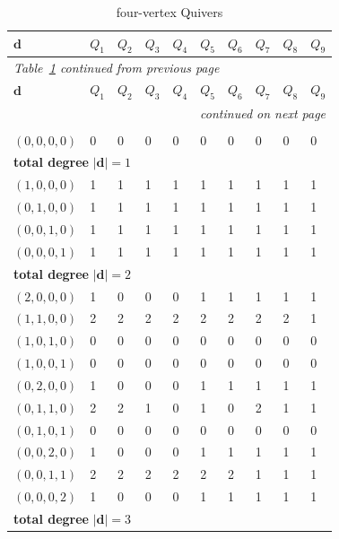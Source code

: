 \documentclass{article}
\newcommand{\bd}{\mathbf{d}}
\begin{document}
\small
\setlength{\tabcolsep}{3pt}
\begin{longtable}{|l|l|l|l|l|l|l|l|l|l|}
\caption{four-vertex Quivers}\label{tab:4vtx}\\
\hline
$\bd$ & $Q_{1}$ & $Q_{2}$ & $Q_{3}$ & $Q_{4}$ & $Q_{5}$ & $Q_{6}$ & $Q_{7}$ & $Q_{8}$ & $Q_{9}$ \\ \hline\hline
\endfirsthead
\multicolumn{10}{l}{\small\itshape Table~\ref{tab:4vtx} continued from previous page} \\ \hline
$\bd$ & $Q_{1}$ & $Q_{2}$ & $Q_{3}$ & $Q_{4}$ & $Q_{5}$ & $Q_{6}$ & $Q_{7}$ & $Q_{8}$ & $Q_{9}$ \\ \hline\hline
\endhead
\hline \multicolumn{10}{r}{\small\itshape continued on next page} \\
\endfoot
\hline
\endlastfoot
\multicolumn{10}{|l|}{\textbf{total degree }$|\bd|=0$} \\ \hline
$(0,0,0,0)$ & 0 & 0 & 0 & 0 & 0 & 0 & 0 & 0 & 0 \\ \hline
\multicolumn{10}{|l|}{\textbf{total degree }$|\bd|=1$} \\ \hline
$(1,0,0,0)$ & 1 & 1 & 1 & 1 & 1 & 1 & 1 & 1 & 1 \\ \hline
$(0,1,0,0)$ & 1 & 1 & 1 & 1 & 1 & 1 & 1 & 1 & 1 \\ \hline
$(0,0,1,0)$ & 1 & 1 & 1 & 1 & 1 & 1 & 1 & 1 & 1 \\ \hline
$(0,0,0,1)$ & 1 & 1 & 1 & 1 & 1 & 1 & 1 & 1 & 1 \\ \hline
\multicolumn{10}{|l|}{\textbf{total degree }$|\bd|=2$} \\ \hline
$(2,0,0,0)$ & 1 & 0 & 0 & 0 & 1 & 1 & 1 & 1 & 1 \\ \hline
$(1,1,0,0)$ & 2 & 2 & 2 & 2 & 2 & 2 & 2 & 2 & 1 \\ \hline
$(1,0,1,0)$ & 0 & 0 & 0 & 0 & 0 & 0 & 0 & 0 & 0 \\ \hline
$(1,0,0,1)$ & 0 & 0 & 0 & 0 & 0 & 0 & 0 & 0 & 0 \\ \hline
$(0,2,0,0)$ & 1 & 0 & 0 & 0 & 1 & 1 & 1 & 1 & 1 \\ \hline
$(0,1,1,0)$ & 2 & 2 & 1 & 0 & 1 & 0 & 2 & 1 & 1 \\ \hline
$(0,1,0,1)$ & 0 & 0 & 0 & 0 & 0 & 0 & 0 & 0 & 0 \\ \hline
$(0,0,2,0)$ & 1 & 0 & 0 & 0 & 1 & 1 & 1 & 1 & 1 \\ \hline
$(0,0,1,1)$ & 2 & 2 & 2 & 2 & 2 & 2 & 1 & 1 & 1 \\ \hline
$(0,0,0,2)$ & 1 & 0 & 0 & 0 & 1 & 1 & 1 & 1 & 1 \\ \hline
\multicolumn{10}{|l|}{\textbf{total degree }$|\bd|=3$} \\ \hline

\end{longtable}
\end{document}
